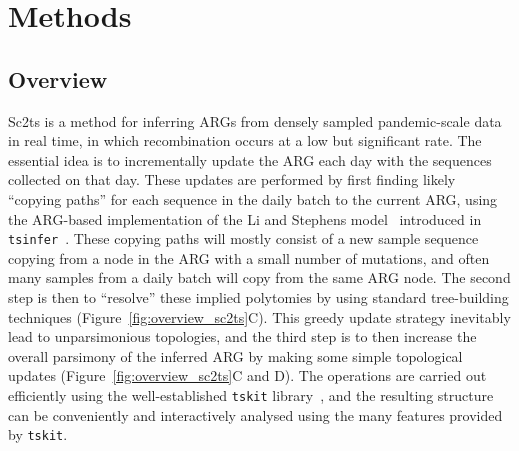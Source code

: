 \documentclass{article}
\begin{document}
\section{Methods}

\subsection{Overview}
Sc2ts is a method for inferring ARGs from densely sampled pandemic-scale data
in real time, in which recombination occurs at a low but significant rate.
The essential idea is to incrementally update the ARG each day
with the sequences collected on that day. These updates are performed by
first finding likely ``copying paths'' for each sequence in the daily
batch to the current ARG, using the ARG-based implementation of
the Li and Stephens model~\citep{Li2003-ib} introduced
in \texttt{tsinfer}~\citep{Kelleher2019-ba}.
These copying paths
will mostly consist of a new sample sequence copying from a node in the ARG
with a small number of mutations, and often many samples
from a daily batch will copy from the same ARG node. The second
step is then to ``resolve'' these implied polytomies by using
standard tree-building techniques (Figure~\ref{fig:overview_sc2ts}C).
This greedy update strategy inevitably lead to unparsimonious
topologies, and the third step is to then increase the
overall parsimony of the inferred ARG by making some simple topological
updates (Figure~\ref{fig:overview_sc2ts}C and D).
The operations are carried out efficiently using the well-established
\texttt{tskit} library~\citep{Kelleher2018-xc,Ralph2020-efficiently},
and the resulting structure can be conveniently and interactively
analysed using the many features provided by \texttt{tskit}.
\end{document}

